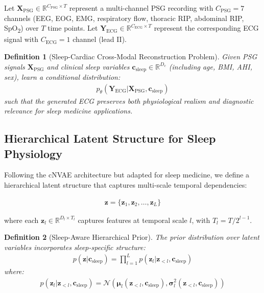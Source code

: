 \documentclass[11pt,en]{elegantpaper}
\newtheorem{definition}{Definition}
\begin{document}
Let $\mathbf{X}_{\text{PSG}} \in \mathbb{R}^{C_{\text{PSG}} \times T}$ represent a multi-channel PSG recording with $C_{\text{PSG}} = 7$ channels (EEG, EOG, EMG, respiratory flow, thoracic RIP, abdominal RIP, SpO\textsubscript{2}) over $T$ time points. Let $\mathbf{Y}_{\text{ECG}} \in \mathbb{R}^{C_{\text{ECG}} \times T}$ represent the corresponding ECG signal with $C_{\text{ECG}} = 1$ channel (lead II).

\begin{definition}[Sleep-Cardiac Cross-Modal Reconstruction Problem]
Given PSG signals $\mathbf{X}_{\text{PSG}}$ and clinical sleep variables $\mathbf{c}_{\text{sleep}} \in \mathbb{R}^{D_c}$ (including age, BMI, AHI, sex), learn a conditional distribution:
\begin{align}
p_\theta(\mathbf{Y}_{\text{ECG}} | \mathbf{X}_{\text{PSG}}, \mathbf{c}_{\text{sleep}})
\end{align}
such that the generated ECG preserves both physiological realism and diagnostic relevance for sleep medicine applications.
\end{definition}

\subsection{Hierarchical Latent Structure for Sleep Physiology}

Following the cNVAE architecture but adapted for sleep medicine, we define a hierarchical latent structure that captures multi-scale temporal dependencies:

\begin{align}
\mathbf{z} = \{\mathbf{z}_1, \mathbf{z}_2, \ldots, \mathbf{z}_L\}
\end{align}

where each $\mathbf{z}_l \in \mathbb{R}^{D_l \times T_l}$ captures features at temporal scale $l$, with $T_l = T / 2^{l-1}$.

\begin{definition}[Sleep-Aware Hierarchical Prior]
The prior distribution over latent variables incorporates sleep-specific structure:
\begin{align}
p(\mathbf{z} | \mathbf{c}_{\text{sleep}}) = \prod_{l=1}^L p(\mathbf{z}_l | \mathbf{z}_{<l}, \mathbf{c}_{\text{sleep}})
\end{align}
where:
\begin{align}
p(\mathbf{z}_l | \mathbf{z}_{<l}, \mathbf{c}_{\text{sleep}}) = \mathcal{N}(\boldsymbol{\mu}_l(\mathbf{z}_{<l}, \mathbf{c}_{\text{sleep}}), \boldsymbol{\sigma}_l^2(\mathbf{z}_{<l}, \mathbf{c}_{\text{sleep}}))
\end{align}
\end{definition}
\end{document}
